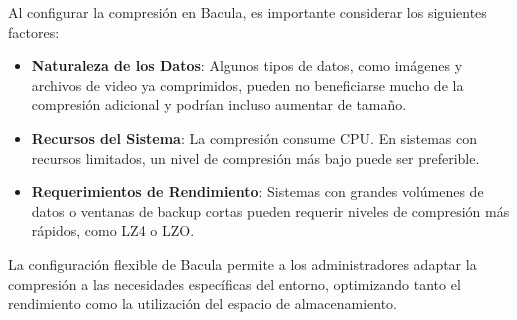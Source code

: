 Al configurar la compresión en Bacula, es importante considerar los siguientes factores:

\begin{itemize}
    \item \textbf{Naturaleza de los Datos}: Algunos tipos de datos, como imágenes y archivos de video ya comprimidos, pueden no beneficiarse mucho de la compresión adicional y podrían incluso aumentar de tamaño.
    \item \textbf{Recursos del Sistema}: La compresión consume CPU. En sistemas con recursos limitados, un nivel de compresión más bajo puede ser preferible.
    \item \textbf{Requerimientos de Rendimiento}: Sistemas con grandes volúmenes de datos o ventanas de backup cortas pueden requerir niveles de compresión más rápidos, como LZ4 o LZO.
\end{itemize}

La configuración flexible de Bacula permite a los administradores adaptar la compresión a las necesidades específicas del entorno, optimizando tanto el rendimiento como la utilización del espacio de almacenamiento.
